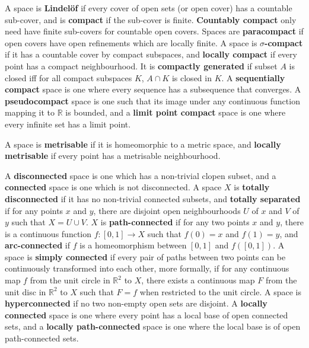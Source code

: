 \documentclass[12pt]{article}
\newcommand{\R}{\mathbb{R}}
\begin{document}
A space is \textbf{Lindel\"{o}f} if every cover of open sets (or open cover) has a countable sub-cover, and is \textbf{compact} if the sub-cover is finite.  \textbf{Countably compact} only need have finite sub-covers for countable open covers. Spaces are \textbf{paracompact} if open covers have open refinements which are locally finite. A space is \textbf{$\sigma$-compact} if it has a countable cover by compact subspaces, and \textbf{locally compact} if every point has a compact neighbourhood. It is \textbf{compactly generated} if subset $A$ is closed iff for all compact subspaces $K$, $A \cap K$ is closed in $K$. A \textbf{sequentially compact} space is one where every sequence has a subsequence that converges. A \textbf{pseudocompact} space is one such that its image under any continuous function mapping it to $\R$ is bounded, and a \textbf{limit point compact} space is one where every infinite set has a limit point.

A space is \textbf{metrisable} if it is homeomorphic to a metric space, and \textbf{locally metrisable} if every point has a metrisable neighbourhood.

A \textbf{disconnected} space is one which has a non-trivial clopen subset, and a \textbf{connected} space is one which is not disconnected. A space $X$ is \textbf{totally disconnected} if it has no non-trivial connected subsets, and \textbf{totally separated} if for any points $x$ and $y$, there are disjoint open neighbourhoods $U$ of $x$ and $V$ of $y$ such that $X = U \cup V$. $X$ is \textbf{path-connected} if for any two points $x$ and $y$, there is a continuous function $f: [0,1] \rightarrow X$ such that $f(0) = x$ and $f(1) = y$, and \textbf{arc-connected} if $f$ is a homeomorphism between $[0,1]$ and $f([0,1])$. A space is \textbf{simply connected} if every pair of paths between two points can be continuously transformed into each other, more formally, if for any continuous map $f$ from the unit circle in $\R^2$ to $X$, there exists a continuous map $F$ from the unit disc in $\R^2$ to $X$ such that $F = f$ when restricted to the unit circle. A space is \textbf{hyperconnected} if no two non-empty open sets are disjoint. A \textbf{locally connected} space is one where every point has a local base of open connected sets, and a \textbf{locally path-connected} space is one where the local base is of open path-connected sets.
\end{document}

